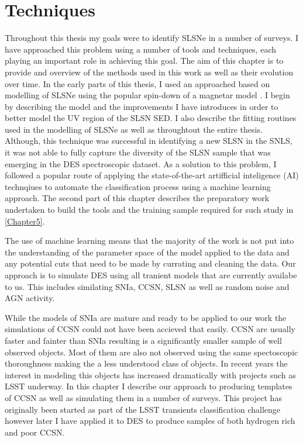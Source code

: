 \chapter{Techniques}
\label{Chapter4}

Throughout this thesis my goals were to identify SLSNe in a number of surveys. I have approached this problem using a number of tools and techniques, each playing an important role in achieving this goal. The aim of this chapter is to provide and overview of the methods used in this work as well as their evolution over time. In the early parts of this thesis, I used an approached based on modelling of SLSNe using the popular spin-down of a magnetar model . I begin by describing the model and the improvements I have introduces in order to better model the UV region of the SLSN SED. I also describe the fitting routines used in the modelling of SLSNe as well as throughtout the entire thesis. Although, this technique was successful in identifying a new SLSN in the SNLS, it was not able to fully capture the diversity of the SLSN sample that was emerging in the DES spectroscopic dataset. As a solution to this problem, I followed a popular route of applying the state-of-the-art artifficial inteligence (AI) technqiues to automate the classification process using a machine learning approach. The second part of this chapter describes the preparatory work undertaken to build the tools and the training sample required for such study in \cref{Chapter5}.

The use of machine learning means that the majority of the work is not put into the understanding of the parameter space of the model applied to the data and any potential cuts that need to be made by currating and cleaning the data. Our approach is to simulate DES using all tranient models that are currently availabe to us. This includes similating SNIa, CCSN, SLSN as well as random noise and AGN activity.

While the models of SNIa are mature and ready to be applied to our work the simulations of CCSN could not have been accieved that easily. CCSN are usually faster and fainter than SNIa resulting is a significantly smaller sample of well observed objects. Most of them are also not observed using the same spectoscopic thoroughness making the a less understood class of objects. In recent years the interest in modeling this objects has increased dramatically with projects such as LSST underway. In this chapter I describe our approach to producing templates of CCSN as well as simulating them in a number of surveys. This project has originally been started as part of the LSST transients classification challenge however later I have applied it to DES to produce samples of both hydrogen rich and poor CCSN.


